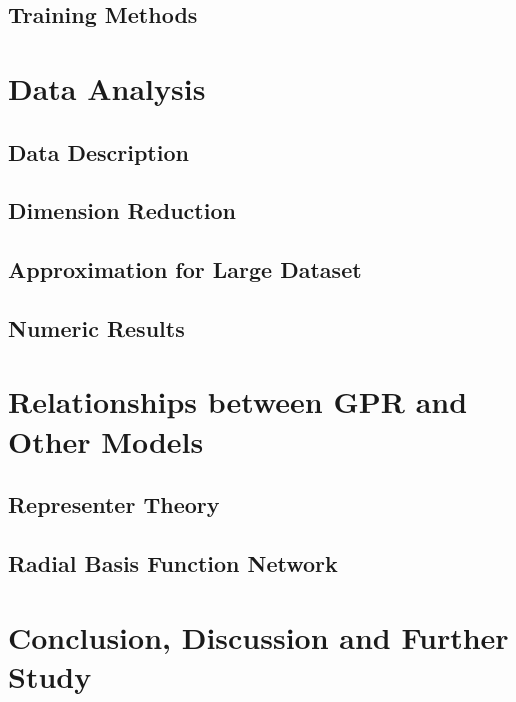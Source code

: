\documentclass[12pt,a4paper]{article}
\theoremstyle{definition}
\numberwithin{equation}{section}
\begin{document}
\subsection{Training Methods}

\newpage
\section{Data Analysis}

\subsection{Data Description}

\subsection{Dimension Reduction}

\subsection{Approximation for Large Dataset}

\subsection{Numeric Results}

\newpage
\section{Relationships between GPR and Other Models}

\subsection{Representer Theory}

\subsection{Radial Basis Function Network}

\newpage
\section{Conclusion, Discussion and Further Study}
\end{document}
